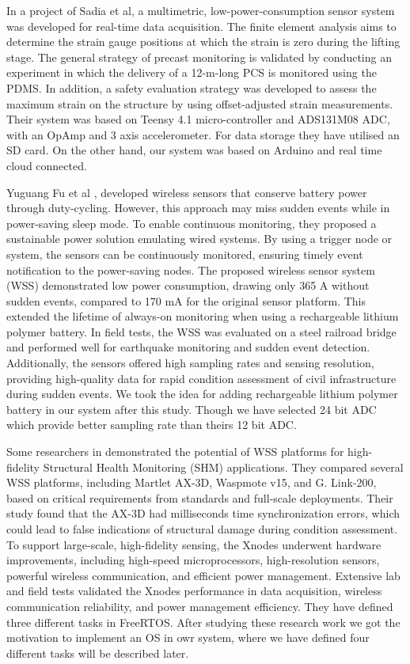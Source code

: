 In a project of Sadia et al, \textbf{\cite{Portable_Sensing}} a multimetric, low-power-consumption sensor system was developed for real-time data acquisition. The finite element analysis aims to determine the strain gauge positions at which the strain is zero during the lifting stage. The general strategy of precast monitoring is validated by conducting an experiment in which the delivery of a 12-m-long PCS is monitored using the PDMS. In addition, a safety evaluation strategy was developed to assess the maximum strain on the structure by using offset-adjusted strain measurements. Their system was based on Teensy 4.1 micro-controller and ADS131M08 ADC, with an OpAmp and 3 axis accelerometer. For data storage they have utilised an SD card. On the other hand, our system was based on Arduino and real time cloud connected.

\vspace{0.5cm}
Yuguang Fu et al \textbf{\cite{Event_Monitor}}, developed wireless sensors that conserve battery power through duty-cycling. However, this approach may miss sudden events while in power-saving sleep mode. To enable continuous monitoring, they proposed a sustainable power solution emulating wired systems. By using a trigger node or system, the sensors can be continuously monitored, ensuring timely event notification to the power-saving nodes. The proposed wireless sensor system (WSS) demonstrated low power consumption, drawing only 365 A without sudden events, compared to 170 mA for the original sensor platform. This extended the lifetime of always-on monitoring when using a rechargeable lithium polymer battery. In field tests, the WSS was evaluated on a steel railroad bridge and performed well for earthquake monitoring and sudden event detection. Additionally, the sensors offered high sampling rates and sensing resolution, providing high-quality data for rapid condition assessment of civil infrastructure during sudden events. We took the idea for adding rechargeable lithium polymer battery in our system after this study. Though we have selected 24 bit ADC which provide better sampling rate than theirs 12 bit ADC.

\vspace{0.5cm}
Some researchers in \textbf{\cite{WireLs_SmartSensor}}demonstrated the potential of WSS platforms for high-fidelity Structural Health Monitoring (SHM) applications. They compared several WSS platforms, including Martlet AX-3D, Waspmote v15, and G. Link-200, based on critical requirements from standards and full-scale deployments. Their study found that the AX-3D had milliseconds time synchronization errors, which could lead to false indications of structural damage during condition assessment. To support large-scale, high-fidelity sensing, the Xnodes underwent hardware improvements, including high-speed microprocessors, high-resolution sensors, powerful wireless communication, and efficient power management. Extensive lab and field tests validated the Xnodes performance in data acquisition, wireless communication reliability, and power management efficiency. They have defined three different tasks in FreeRTOS. After studying these research work we got the motivation to implement an OS in owr system, where we have defined four different tasks will be described later.

